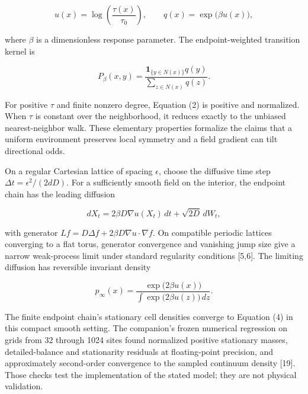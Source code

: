 \documentclass[
  american,
  11pt,
  letterpaper,
]{article}
\begin{document}
\begin{equation}
u(x)=\log\!\left(\frac{\tau(x)}{\tau_0}\right),
\qquad q(x)=\exp\!\bigl(\beta u(x)\bigr),
\tag{1}
\end{equation}

where \(\beta\) is a dimensionless response parameter. The endpoint-weighted transition kernel is

\begin{equation}
P_\beta(x,y)=
\frac{\mathbf 1_{\{y\in N(x)\}}q(y)}
{\sum_{z\in N(x)}q(z)}.
\tag{2}
\end{equation}

For positive \(\tau\) and finite nonzero degree, Equation (2) is positive and normalized. When \(\tau\) is constant over the neighborhood, it reduces exactly to the unbiased nearest-neighbor walk. These elementary properties formalize the claims that a uniform environment preserves local symmetry and a field gradient can tilt directional odds.

On a regular Cartesian lattice of spacing \(\epsilon\), choose the diffusive time step \(\Delta t=\epsilon^2/(2dD)\). For a sufficiently smooth field on the interior, the endpoint chain has the leading diffusion

\begin{equation}
dX_t=2\beta D\nabla u(X_t)\,dt+\sqrt{2D}\,dW_t,
\tag{3}
\end{equation}

with generator \(Lf=D\Delta f+2\beta D\nabla u\cdot\nabla f\). On compatible periodic lattices converging to a flat torus, generator convergence and vanishing jump size give a narrow weak-process limit under standard regularity conditions {[}5,6{]}. The limiting diffusion has reversible invariant density

\begin{equation}
p_\infty(x)=
\frac{\exp\!\bigl(2\beta u(x)\bigr)}
{\int \exp\!\bigl(2\beta u(z)\bigr)\,dz}.
\tag{4}
\end{equation}

The finite endpoint chain's stationary cell densities converge to Equation (4) in this compact smooth setting. The companion's frozen numerical regression on grids from 32 through 1024 sites found normalized positive stationary masses, detailed-balance and stationarity residuals at floating-point precision, and approximately second-order convergence to the sampled continuum density {[}19{]}. Those checks test the implementation of the stated model; they are not physical validation.
\end{document}
